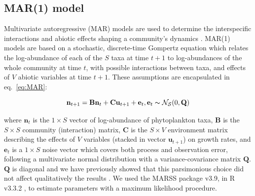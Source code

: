\documentclass[10pt]{article}
\begin{document}
\subsection*{MAR(1) model}

Multivariate autoregressive (MAR) models are used to determine the
interspecific interactions and abiotic effects shaping a community's
dynamics \citep{ives_estimating_2003}. MAR(1) models are based on
a stochastic, discrete-time Gompertz equation which relates the log-abundance
of each of the $S$ taxa at time $t+1$ to log-abundances of the whole
community at time $t$, with possible interactions between taxa, and
effects of $V$ abiotic variables at time $t+1$. These assumptions
are encapsulated in eq.~\ref{eq:MAR}:

\begin{equation}
\mathbf{n}_{t+1}=\mathbf{B}\mathbf{n}_{t}+\textbf{C}\textbf{u}_{t+1}+\mathbf{e}_{t},\mathbf{e}_{t}\thicksim\mathcal{{N_{S}}}(0,\mathbf{Q})\label{eq:MAR}
\end{equation}

where $\mathbf{n}_{\ensuremath{t}}$ is the $1\times S$ vector of
log-abundance of phytoplankton taxa, $\mathbf{B}$ is the $S\times S$
community (interaction) matrix, $\mathbf{C}$ is the $S\times V$
environment matrix describing the effects of $V$ variables (stacked
in vector $\mathbf{u}_{t+1}$) on growth
rates, and $\mathbf{e}_{t}$ is a $1\times S$ noise vector which
covers both process and observation error, following a multivariate
normal distribution with a variance-covariance matrix $\mathbf{Q}$.
$\mathbf{Q}$ is diagonal and we have previously showed that this
parsimonious choice did not affect qualitatively the results \citep{barraquand_coastal_2018}. We used the MARSS package \citep{holmes_analysis_2014} v3.9, in R
v3.3.2 \citep{venables_r_2013}, to estimate parameters with a maximum
likelihood procedure.
\end{document}
